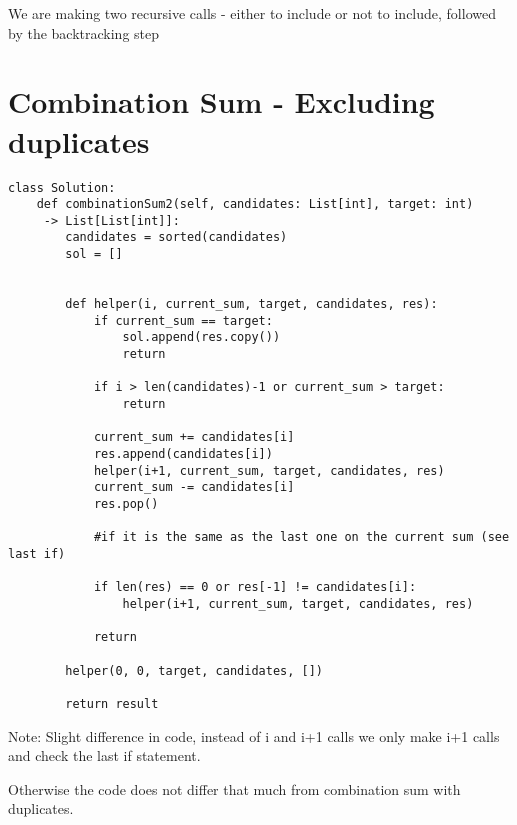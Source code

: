\documentclass[a4]{article}
\begin{document}
We are making two recursive calls - either to include or not to include, followed by the backtracking step

\newpage
\section{Combination Sum - Excluding duplicates}
\begin{lstlisting}
class Solution:
    def combinationSum2(self, candidates: List[int], target: int)
     -> List[List[int]]:
        candidates = sorted(candidates)
        sol = []
        
        
        def helper(i, current_sum, target, candidates, res):
            if current_sum == target:
                sol.append(res.copy())
                return 
            
            if i > len(candidates)-1 or current_sum > target:
                return
            
            current_sum += candidates[i]
            res.append(candidates[i])
            helper(i+1, current_sum, target, candidates, res)
            current_sum -= candidates[i]
            res.pop()
            
            #if it is the same as the last one on the current sum (see last if)

            if len(res) == 0 or res[-1] != candidates[i]:
                helper(i+1, current_sum, target, candidates, res)
            
            return
        
        helper(0, 0, target, candidates, [])
        
        return result
\end{lstlisting}

Note: Slight difference in code, instead of i and i+1 calls we only make i+1 calls and check the last if statement.

Otherwise the code does not differ that much from combination sum with duplicates.

\newpage
\end{document}
